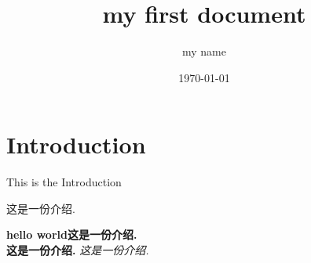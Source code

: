 \documentclass[a4paper,12pt]{article}
\begin{document}
\title{my first document}
\author{my name}
\date{\today}
\maketitle

\tableofcontents
\newpage
{}


\section{Introduction}
This is the Introduction

这是一份介绍.


\textbf{hello world这是一份介绍.}
\\
\textbf{这是一份介绍.}
\textit{这是一份介绍.}
\end{document}
